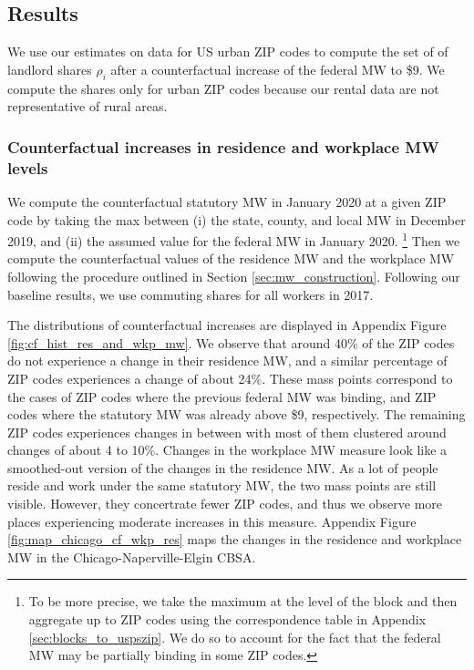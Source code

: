 \subsection{Results}\label{sec:results_cf}

We use our estimates on data for US urban ZIP codes to compute the set of
of landlord shares ${\rho_i}$ after a counterfactual increase of the federal 
MW to \$9.
We compute the shares only for urban ZIP codes because our rental data are not 
representative of rural areas.

\subsubsection*{Counterfactual increases in residence and workplace MW levels}
\label{sec:cf_res_and_wkp_changes}

We compute the counterfactual statutory MW in January 2020 at a given ZIP code 
by taking the max between (i) the state, county, and local MW in December 2019, 
and (ii) the assumed value for the federal MW in January 2020.%
\footnote{To be more precise, we take the maximum at the level of the block and 
then aggregate up to ZIP codes using the correspondence table in Appendix 
\ref{sec:blocks_to_uspszip}.
We do so to account for the fact that the federal MW may be partially binding
in some ZIP codes.}
Then we compute the counterfactual values of the residence MW and the workplace
MW following the procedure outlined in Section \ref{sec:mw_construction}.
Following our baseline results, we use commuting shares for all workers in
2017.

The distributions of counterfactual increases are displayed in Appendix
Figure \ref{fig:cf_hist_res_and_wkp_mw}.
We observe that around 40\% of the ZIP codes do not experience a change 
in their residence MW, and a similar percentage of ZIP codes experiences a
change of about 24\%.
These mass points correspond to the cases of ZIP codes where the previous 
federal MW was binding, and ZIP codes where the statutory MW was already 
above \$9, respectively.
The remaining ZIP codes experiences changes in between with most of them
clustered around changes of about 4 to 10\%.
Changes in the workplace MW measure look like a smoothed-out version of
the changes in the residence MW.
As a lot of people reside and work under the same statutory MW, the two mass
points are still visible.
However, they concertrate fewer ZIP codes, and thus we observe more places 
experiencing moderate increases in this measure.
Appendix Figure \ref{fig:map_chicago_cf_wkp_res} maps the changes in the 
residence and workplace MW in the Chicago-Naperville-Elgin CBSA.


